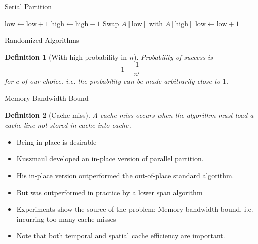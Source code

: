 \documentclass[x11names, svgnames, rgb]{beamer}
\newtheorem{defin}{Definition}
\begin{document}
\begin{frame}[t]{Serial Partition}  %
	\begin{algorithmic}
			\State $\text{low} \gets \text{low}+1$
		\EndWhile
		\State $\text{high} \gets \text{high}-1$
		\EndWhile
		\State Swap $A[\text{low}]$ with $A[\text{high}]$
	\EndWhile
	\State $\text{low} \gets \text{low}+1$
	\EndIf
\end{algorithmic}

\end{frame}

\begin{frame}[t]{Randomized Algorithms}
	\begin{defin}[With high probability in $n$]
		Probability of success is 
		$$1-\frac{1}{n^c}$$
		for $c$ of our choice. i.e. the probability can be made arbitrarily close to $1$.
	\end{defin}
\end{frame}

\begin{frame}[t]{Memory Bandwidth Bound}
	\begin{defin}[Cache miss]
		A cache miss occurs when the algorithm must load a cache-line not stored in cache into cache.
	\end{defin}	
	\begin{itemize}
		\item Being in-place is desirable 
		\item Kuszmaul developed an in-place version of parallel partition.
		\item His in-place version outperformed the out-of-place standard algorithm.
		\item But was outperformed in practice by a lower span algorithm
		\item Experiments show the source of the problem: Memory bandwidth bound, i.e. incurring too many cache misses
		\item Note that both temporal and spatial cache efficiency are important.
	\end{itemize}
\end{frame}
\end{document}
